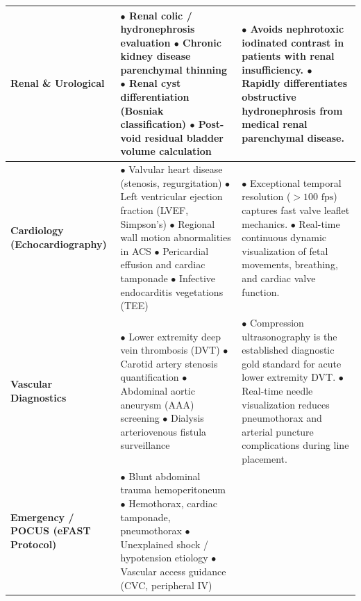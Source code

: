 \documentclass[11pt,a4paper]{article}
\begin{document}
\begin{longtable}{p{3.2cm}p{6cm}p{6cm}}
\textbf{Renal \& Urological} & 
$\bullet$ Renal colic / hydronephrosis evaluation\newline
$\bullet$ Chronic kidney disease parenchymal thinning\newline
$\bullet$ Renal cyst differentiation (Bosniak classification)\newline
$\bullet$ Post-void residual bladder volume calculation & 
$\bullet$ Avoids nephrotoxic iodinated contrast in patients with renal insufficiency.\newline
$\bullet$ Rapidly differentiates obstructive hydronephrosis from medical renal parenchymal disease. \\
\midrule
\textbf{Cardiology (Echocardiography)} & 
$\bullet$ Valvular heart disease (stenosis, regurgitation)\newline
$\bullet$ Left ventricular ejection fraction (LVEF, Simpson's)\newline
$\bullet$ Regional wall motion abnormalities in ACS\newline
$\bullet$ Pericardial effusion and cardiac tamponade\newline
$\bullet$ Infective endocarditis vegetations (TEE) & 
$\bullet$ Exceptional temporal resolution ($>100\text{ fps}$) captures fast valve leaflet mechanics.\newline
$\bullet$ Real-time continuous dynamic visualization of fetal movements, breathing, and cardiac valve function. \\
\midrule
\textbf{Vascular Diagnostics} & 
$\bullet$ Lower extremity deep vein thrombosis (DVT)\newline
$\bullet$ Carotid artery stenosis quantification\newline
$\bullet$ Abdominal aortic aneurysm (AAA) screening\newline
$\bullet$ Dialysis arteriovenous fistula surveillance & 
$\bullet$ Compression ultrasonography is the established diagnostic gold standard for acute lower extremity DVT.\newline
$\bullet$ Real-time needle visualization reduces pneumothorax and arterial puncture complications during line placement. \\
\midrule
\textbf{Emergency / POCUS (eFAST Protocol)} & 
$\bullet$ Blunt abdominal trauma hemoperitoneum\newline
$\bullet$ Hemothorax, cardiac tamponade, pneumothorax\newline
$\bullet$ Unexplained shock / hypotension etiology\newline
$\bullet$ Vascular access guidance (CVC, peripheral IV) & 

\end{longtable}
\end{document}
